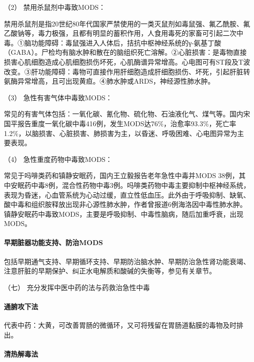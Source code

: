 \hypertarget{text00130.htmlux5cux23CHP5-1-3-2-6-1-2}{}
（2） 禁用杀鼠剂中毒致MODS：

禁用杀鼠剂是指20世纪80年代国家严禁使用的一类灭鼠剂如毒鼠强、氟乙酰胺、氟乙酸钠等，毒力极强，且都有明显的蓄积作用，人食用毒死的家畜可引起二次中毒。①脑功能障碍：毒鼠强进入人体后，拮抗中枢神经系统的γ-氨基丁酸（GABA）。尸检均有脑水肿和散在的脑组织死亡溶解。②心脏损害：是毒物直接损害心肌细胞造成心肌细胞损伤坏死，心肌酶谱异常增高。心电图可有ST段及T波改变。③肝功能障碍：毒物可直接作用肝细胞造成肝细胞损伤、坏死，引起肝脏转氨酶异常增高，且可出现黄疸。④肺水肿或ARDS，神经源性肺水肿。

\hypertarget{text00130.htmlux5cux23CHP5-1-3-2-6-1-3}{}
（3） 急性有害气体中毒致MODS：

常见的有害气体包括：一氧化碳、氰化物、硫化物、石油液化气、煤气等。国内宋国平报告重度一氧化碳中毒416例，发生MODS达76\%，治愈率93.3\%，死亡率1.2\%，以脑损害、心脏损害、肺损害为主，以昏迷、呼吸困难、心电图异常为主要表现。

\hypertarget{text00130.htmlux5cux23CHP5-1-3-2-6-1-4}{}
（4） 急性重度药物中毒致MODS：

常见于吗啡类药和镇静安眠药，国内王立毅报告老年急性中毒并MODS
38例，其中安眠药中毒8例，混合性药物中毒3例。吗啡类药物中毒主要抑制中枢神经系统，表现为昏迷，心血管系统为心动过缓，直立性低血压。此外由于呼吸抑制、缺氧、酸中毒和组织胺释放出现非心源性肺水肿，作者曾报道6例海洛因中毒性肺水肿。镇静安眠药中毒致MODS，主要是呼吸抑制、中毒性脑病，随后加重呼衰，出现MODS。

\paragraph{早期脏器功能支持、防治MODS}

包括早期通气支持、早期循环支持、早期防治脑水肿、早期防治急性肾功能衰竭、注意肝脏的早期保护、纠正水电解质和酸碱的失衡等，参见有关章节。

\hypertarget{text00130.htmlux5cux23CHP5-1-3-2-7}{}
（七） 充分发挥中医中药的法与药救治急性中毒

\paragraph{通腑攻下法}

代表中药：大黄，可改善胃肠的微循环，又可将残留在胃肠道黏膜的毒物及时排出。

\paragraph{清热解毒法}

